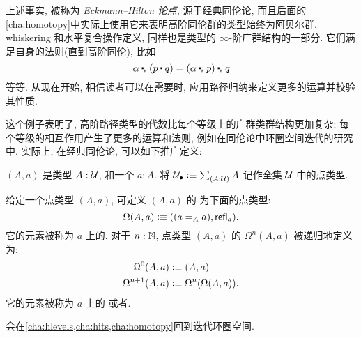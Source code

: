 上述事实, 被称为 \emph{Eckmann–Hilton 论点}, 源于经典同伦论, 而且后面的\cref{cha:homotopy}中实际上使用它来表明高阶同伦群的类型始终为阿贝尔群.
whiskering 和水平复合操作定义, 同样也是类型的 $\infty$-阶广群结构的一部分.
它们满足自身的法则(直到高阶同伦), 比如
\[
    \alpha \rightwhisker (p\ct q) = (\alpha \rightwhisker p) \rightwhisker q
\]
等等.
从现在开始, 相信读者可以在需要时, 应用路径归纳来定义更多的运算并校验其性质.

这个例子表明了, 高阶路径类型的代数比每个等级上的广群类群结构更加复杂;
每个等级的相互作用产生了更多的运算和法则, 例如在同伦论中环圈空间迭代的研究中.
实际上, 在经典同伦论, 可以如下推广定义:

\begin{defn}
    \label{def:pointedtype}
    $(A,a)$ 是类型 $A:\type$, 和一个 $a:A$.
    将 $\pointed{\type} \defeq \sm{A:\type} A$ 记作全集 $\type$ 中的点类型.
\end{defn}

\begin{defn}
    \label{def:loopspace}
    给定一个点类型 $(A,a)$, 可定义 $(A,a)$ 的%
    为下面的点类型:
    \[\Omega(A,a)\defeq ((\id[A]aa),\refl a).\]
    它的元素被称为 $a$ 上的.
    对于 $n:\N$, 点类型 $(A,a)$ 的  $\Omega^{n}(A,a)$
    被递归地定义为:
    \begin{align*}
        \Omega^0(A,a)&\defeq(A,a)\\
        \Omega^{n+1}(A,a)&\defeq\Omega^n(\Omega(A,a)).
    \end{align*}
    它的元素被称为 $a$ 上的
    或者.

\end{defn}

会在\cref{cha:hlevels,cha:hits,cha:homotopy}回到迭代环圈空间.
%
%